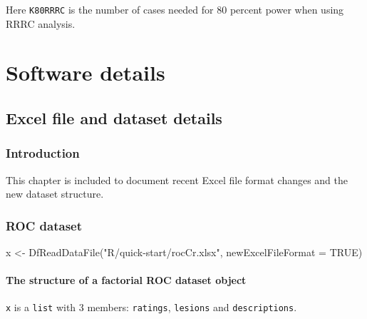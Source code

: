 \documentclass[
]{book}
\newenvironment{Shaded}{\begin{snugshade}}{\end{snugshade}}
\newcommand{\AttributeTok}[1]{\textcolor[rgb]{0.77,0.63,0.00}{#1}}
\newcommand{\CommentTok}[1]{\textcolor[rgb]{0.56,0.35,0.01}{\textit{#1}}}
\newcommand{\ConstantTok}[1]{\textcolor[rgb]{0.00,0.00,0.00}{#1}}
\newcommand{\DecValTok}[1]{\textcolor[rgb]{0.00,0.00,0.81}{#1}}
\newcommand{\FunctionTok}[1]{\textcolor[rgb]{0.00,0.00,0.00}{#1}}
\newcommand{\NormalTok}[1]{#1}
\newcommand{\OtherTok}[1]{\textcolor[rgb]{0.56,0.35,0.01}{#1}}
\newcommand{\StringTok}[1]{\textcolor[rgb]{0.31,0.60,0.02}{#1}}
\begin{document}
Here \texttt{K80RRRC} is the number of cases needed for 80 percent power when using RRRC analysis.

\hypertarget{part-software-details}{%
\part*{Software details}\label{part-software-details}}

\hypertarget{dataset-object-details}{%
\chapter{Excel file and dataset details}\label{dataset-object-details}}

\hypertarget{introduction-1}{%
\section{Introduction}\label{introduction-1}}

This chapter is included to document recent Excel file format changes and the new dataset structure.

\hypertarget{dataset-object-details-roc-dataset}{%
\section{ROC dataset}\label{dataset-object-details-roc-dataset}}

\begin{Shaded}
\begin{Highlighting}[]
\NormalTok{x }\OtherTok{\textless{}{-}} \FunctionTok{DfReadDataFile}\NormalTok{(}\StringTok{"R/quick{-}start/rocCr.xlsx"}\NormalTok{, }\AttributeTok{newExcelFileFormat =} \ConstantTok{TRUE}\NormalTok{)}
\end{Highlighting}
\end{Shaded}

\hypertarget{dataset-object-details-structure-roc-dataset}{%
\subsection{The structure of a factorial ROC dataset object}\label{dataset-object-details-structure-roc-dataset}}

\texttt{x} is a \texttt{list} with 3 members: \texttt{ratings}, \texttt{lesions} and \texttt{descriptions}.

\begin{Shaded}
\end{Shaded}
\end{document}
